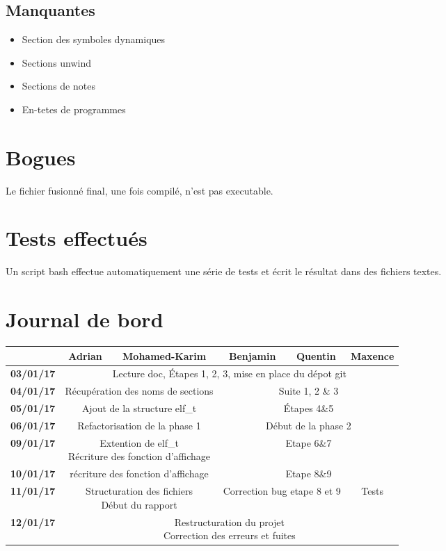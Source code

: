 \documentclass[10pt,oneside]{article}   %
\begin{document}
	\subsection{Manquantes}
		\begin{itemize}
			\item Section des symboles dynamiques
			\item Sections unwind
			\item Sections de notes
			\item En-tetes de programmes
		\end{itemize}

\section{Bogues}
	Le fichier fusionné final, une fois compilé, n'est pas executable.


\section{Tests effectués}
	Un script bash effectue automatiquement une série de tests et écrit le résultat dans des fichiers textes.

\section{Journal de bord}

	\tabcolsep=0.11cm
	\begin{tabular}{| c || *{4}{c|} c |}
		\hline
		& Adrian & Mohamed-Karim & Benjamin & Quentin & Maxence \\
		\hline
		\hline
		\bf{03/01/17} & \multicolumn{5}{c|}{Lecture doc, Étapes 1, 2, 3, mise en place du dépot git}\\
		\hline
		\bf{04/01/17} & \multicolumn{2}{c|}{Récupération des noms de sections} & \multicolumn{3}{c|}{Suite 1, 2 \& 3} \\
		\hline
		\bf{05/01/17} & \multicolumn{2}{c|}{Ajout de la structure elf\_t} & \multicolumn{3}{c|}{Étapes 4\&5} \\
		\hline
		\bf{06/01/17} & \multicolumn{2}{c|}{Refactorisation de la phase 1} & \multicolumn{3}{c|}{Début de la phase 2} \\
		\hline
		\bf{09/01/17} & \multicolumn{2}{c|}{\parbox[h]{5cm}{Extention de elf\_t\\Récriture des fonction d'affichage}} & \multicolumn{3}{c|}{Etape 6\&7} \\
		\hline
		\bf{10/01/17} & \multicolumn{2}{c|}{récriture des fonction d'affichage} & \multicolumn{3}{c|}{Etape 8\&9} \\
		\hline
		\bf{11/01/17} & \multicolumn{2}{c|}{\parbox[h]{5cm}{Structuration des fichiers\\ Début du rapport}} & \multicolumn{2}{c|}{Correction bug etape 8 et 9} & Tests\\
		\hline
		\bf{12/01/17} & \multicolumn{5}{c|}{\parbox[h]{5cm}{Restructuration du projet\\Correction des erreurs et fuites\\} }\\
		\hline
	\end{tabular}
\end{document}
